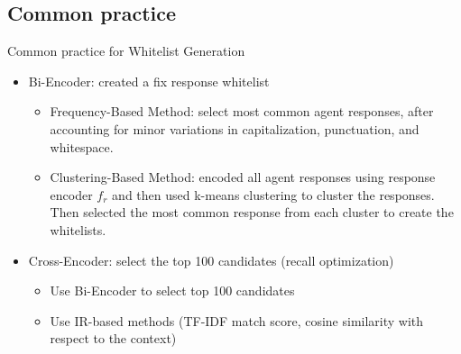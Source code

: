 \documentclass{beamer}
\begin{document}
\subsection{Common practice}
\begin{frame}{Common practice for Whitelist Generation}
    \begin{itemize}
        \item Bi-Encoder: created a fix response whitelist
        \begin{itemize}
            \item Frequency-Based Method: select most common agent responses, after accounting for minor variations in capitalization, punctuation, and whitespace.
            \item Clustering-Based Method: encoded all agent responses using response encoder $f_r$ and then used k-means clustering to cluster the responses. Then selected the most common response from each cluster to create the whitelists.
        \end{itemize}

        \item Cross-Encoder:  select the top 100 candidates (recall optimization)
        \begin{itemize}
            \item Use Bi-Encoder to select top 100 candidates
            \item Use IR-based methods (TF-IDF match score, cosine similarity with respect to the context)
        \end{itemize}
    \end{itemize}
\end{frame}
\end{document}
